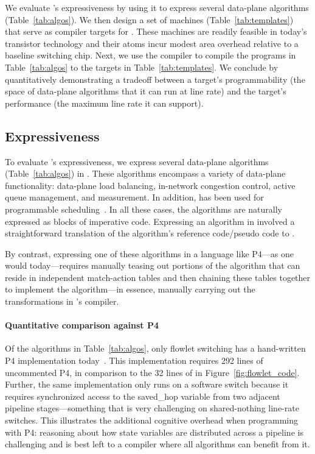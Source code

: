 We evaluate \pktlanguage's expressiveness by using it to express several
data-plane algorithms (Table~\ref{tab:algos}). We then design a set of
\absmachine machines (Table~\ref{tab:templates}) that serve as compiler targets
for \pktlanguage.  These machines are readily feasible in today's transistor
technology and their atoms incur modest area overhead relative to a baseline
switching chip. Next, we use the \pktlanguage compiler to compile the programs
in Table~\ref{tab:algos} to the targets in Table~\ref{tab:templates}.  We
conclude by quantitatively demonstrating a tradeoff between a target's
programmability (the space of data-plane algorithms that it can run at line
rate) and the target's performance (the maximum line rate it can support).

\subsection{Expressiveness}
\label{ss:Expressiveness}

To evaluate \pktlanguage's expressiveness, we express several data-plane
algorithms (Table~\ref{tab:algos}) in \pktlanguage. These algorithms encompass
a variety of data-plane functionality: data-plane load balancing, in-network
congestion control, active queue management, and measurement. In addition,
\pktlanguage has been used for programmable scheduling~\cite{prog_sched_arxiv}.
In all these cases, the algorithms are naturally expressed as blocks of
imperative code. Expressing an algorithm in \pktlanguage involved a
straightforward translation of the algorithm's reference code/pseudo code to
\pktlanguage.

By contrast, expressing one of these algorithms in a language like P4---as one
would today---requires manually teasing out portions of the algorithm that can
reside in independent match-action tables and then chaining these tables
together to implement the algorithm---in essence, manually carrying out the
transformations in \pktlanguage's compiler.

\paragraph{Quantitative comparison against P4}
Of the algorithms in Table~\ref{tab:algos}, only flowlet switching has a
hand-written P4 implementation today~\cite{p4_flowlet}. This implementation
requires 292 lines of uncommented P4, in comparison to the 32 lines of
\pktlanguage in Figure~\ref{fig:flowlet_code}. Further, the same implementation
only runs on a software switch because it requires synchronized access to the
saved\_hop variable from two adjacent pipeline stages---something that is very
challenging on shared-nothing line-rate switches. This illustrates the
additional cognitive overhead when programming with P4: reasoning about how
state variables are distributed across a pipeline is challenging and is best
left to a compiler where all algorithms can benefit from it.

